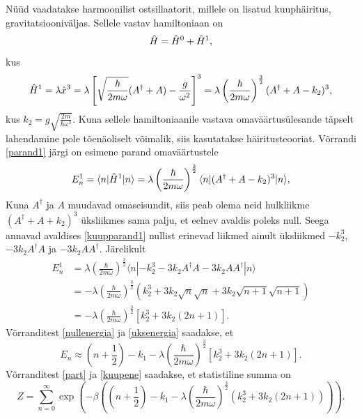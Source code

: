 \documentclass{trkut}%
\renewcommand\braket[1]{\langle{#1}\rangle}
\begin{document}
Nüüd vaadatakse harmoonilist ostsillaatorit, millele on lisatud kuuphäiritus, gravitatsiooniväljas. Sellele vastav hamiltoniaan on
\begin{equation}
    \op{H}=\op[0]{H}+\op[1]{H},
\end{equation}
kus
\begin{equation}
    \op[1]{H}=\lambda \op{x}^3 = \lambda \left[ \sqrt{\frac{\hbar}{2m\omega}}(A^\dagger + A) - \frac{g}{\omega^2}\right]^3=\lambda \left(\frac{\hbar}{2m\omega}\right)^\frac{3}{2} (A^\dagger + A - k_2)^3,
\end{equation}
kus $k_2=g\sqrt{\frac{2m}{\hbar \omega^3}}$.
Kuna sellele hamiltoniaanile vastava omaväärtusülesande täpselt lahendamine pole tõenäoliselt võimalik, siis kasutatakse häiritusteooriat. Võrrandi \eqref{parand1} järgi on esimene parand omaväärtustele
\begin{equation}
    E_n^1=\braket{n|\op[1]{H}|n}=\lambda \left(\frac{\hbar}{2m\omega}\right)^\frac{3}{2} \braket{n|(A^\dagger + A - k_2)^3|n},
    \label{kuupparand1}
\end{equation}
Kuna $A^\dagger$ ja $A$ muudavad omaseisundit, siis peab olema neid hulkliikme $(A^\dagger + A + k_2)^3$ üksliikmes sama palju, et eelnev avaldis poleks null. Seega annavad avaldises \eqref{kuupparand1} nullist erinevad liikmed ainult üksliikmed $-k_2^3$, $-3k_2A^\dagger A$ ja $-3k_2AA^\dagger$. Järelikult
\begin{align}
    E_n^1&=\lambda \left(\frac{\hbar}{2m\omega}\right)^\frac{3}{2} \braket{n|-k_2^3-3k_2A^\dagger A- 3k_2 A A^\dagger|n} \nonumber \\
    &= -\lambda \left(\frac{\hbar}{2m\omega}\right)^\frac{3}{2} (k_2^3 + 3k_2\sqrt{n}\sqrt{n} + 3k_2\sqrt{n+1}\sqrt{n+1}) \nonumber \\
    &= -\lambda \left(\frac{\hbar}{2m\omega}\right)^\frac{3}{2} [k_2^3 + 3k_2(2n+1)] \label{uksenergia}.
\end{align}
Võrranditest \eqref{nullenergia} ja \eqref{uksenergia} saadakse, et
\begin{equation}
    E_n \approx \left(n+\frac{1}{2}\right) - k_1 - \lambda \left(\frac{\hbar}{2m\omega}\right)^\frac{3}{2} [k_2^3 + 3k_2(2n+1)].
    \label{kuupene}
\end{equation}
Võrranditest \eqref{part} ja \eqref{kuupene} saadakse, et statistiline summa on
\begin{equation}
    Z=\sum_{n=0}^{\infty} \exp\left(-\beta \left(\left(n+\frac{1}{2}\right) - k_1 - \lambda \left(\frac{\hbar}{2m\omega}\right)^\frac{3}{2} (k_2^3 + 3k_2(2n+1)) \right)\right).
\end{equation}
\end{document}

